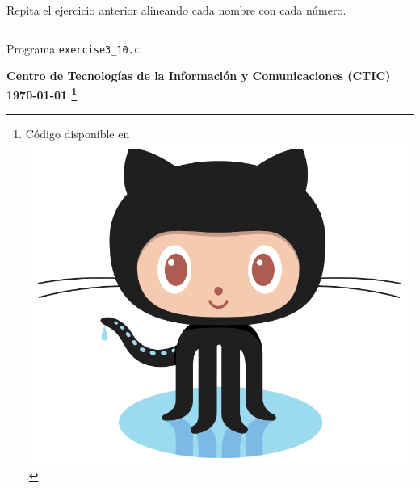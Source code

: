 \documentclass[spanish,addpoints,answers,a4paper]{exam}
\newcommand{\unmarkedfntext}[1]{%
	\begingroup
	\renewcommand\thefootnote{}\footnote{#1}%
	\addtocounter{footnote}{-1}%
	\endgroup
}
\newcommand{\mychar}{%
	\begingroup\normalfont
	\includegraphics[height=\fontcharht\font`\B]{Octocat.png}%
	\endgroup
}
\begin{document}
\begin{questions}
\question Repita el ejercicio anterior alineando cada nombre con cada número.

\begin{solution}
\begin{listing}[H]
	\footnotesize
	\inputminted{c}{exercise3_10.c}
	\caption{Programa \texttt{exercise3\_10.c}.}
	\label{lst:3.10}
\end{listing}	
\end{solution}

\end{questions}

\begin{flushright}\bfseries
Centro de Tecnologías de la Información y Comunicaciones (CTIC)\\[2mm]
\today\unmarkedfntext{Código disponible en \href{https://github.com/carlosal1015/C-Programming}{\mychar{}}.}
\end{flushright}
\end{document}
